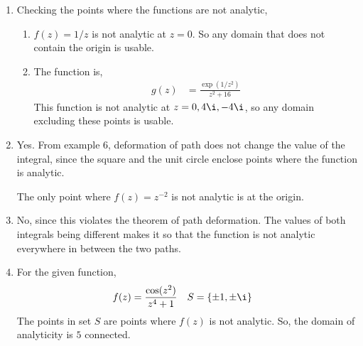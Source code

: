 \begin{enumerate}
    \item Checking the points where the functions are not analytic,
          \begin{enumerate}
              \item $ f(z) = 1/z $ is not analytic at $ z = 0 $. So any domain that does
                    not contain the origin is usable.
              \item The function is,
                    \begin{align}
                        g(z) & = \frac{\exp(1/z^2)}{z^2 + 16}
                    \end{align}
                    This function is not analytic at $ z = 0, 4\i, -4\i $, so any domain
                    excluding these points is usable.
          \end{enumerate}

    \item \textcolor{y_h}{Yes}. From example $ 6 $, deformation of path does not change
          the value of the integral, since the square and the unit circle enclose points
          where the function is analytic. \par
          The only point where $ f(z) = z^{-2} $ is not analytic is at the origin.

    \item \textcolor{y_p}{No}, since this violates the theorem of path deformation.
          The values of both integrals being different makes it so that the function is
          not analytic everywhere in between the two paths.

    \item For the given function,
          \begin{align}
              f(z) & = \frac{\cos(z^2)}{z^4 + 1} &
              S    & = \{\pm 1, \pm \i\}
          \end{align}
          The points in set $ S $ are points where $ f(z) $ is not analytic. So, the
          domain of analyticity is $ 5 $ connected.


\end{enumerate}
